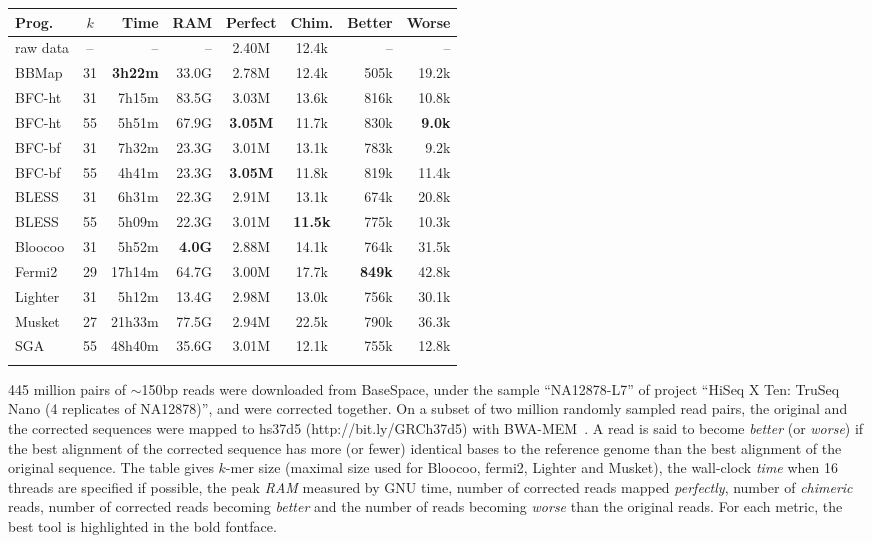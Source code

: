 \documentclass{bioinfo}
\begin{document}
\begin{table}[t]
{\footnotesize
\begin{tabular}{lcrrccrr}
\toprule
Prog.     & $k$ & Time  & RAM   & Perfect&Chim.& Better & Worse \\
\midrule
raw data  & --  & --    & --    & 2.40M  & 12.4k  & --     & -- \\
BBMap     & 31  &{\bf 3h22m}&33.0G& 2.78M& 12.4k  & 505k   & 19.2k \\
BFC-ht    & 31  & 7h15m & 83.5G & 3.03M  &13.6k   & 816k   & 10.8k \\
BFC-ht    & 55  & 5h51m & 67.9G &{\bf 3.05M}&11.7k& 830k   &{\bf 9.0k}\\
BFC-bf    & 31  & 7h32m & 23.3G & 3.01M  & 13.1k  & 783k   & 9.2k \\
BFC-bf    & 55  & 4h41m & 23.3G &{\bf 3.05M}&11.8k& 819k   & 11.4k \\
BLESS     & 31  & 6h31m & 22.3G & 2.91M  & 13.1k  & 674k   & 20.8k \\
BLESS     & 55  & 5h09m & 22.3G & 3.01M  &{\bf 11.5k}& 775k& 10.3k \\
Bloocoo   & 31  & 5h52m &{\bf 4.0G}&2.88M& 14.1k  & 764k   & 31.5k  \\
Fermi2    & 29  &17h14m & 64.7G & 3.00M  & 17.7k  &{\bf 849k}&42.8k \\
Lighter   & 31  & 5h12m & 13.4G & 2.98M  & 13.0k  & 756k   & 30.1k  \\
Musket    & 27  &21h33m & 77.5G & 2.94M  & 22.5k  & 790k   & 36.3k  \\
SGA       & 55  &48h40m & 35.6G & 3.01M  & 12.1k  & 755k   & 12.8k  \\
\botrule
\end{tabular}}{445 million pairs of $\sim$150bp reads were downloaded from
BaseSpace, under the sample ``NA12878-L7'' of project ``HiSeq X Ten: TruSeq
Nano (4 replicates of NA12878)'', and were corrected together. On a subset of
two million randomly sampled read pairs, the original and the corrected
sequences were mapped to hs37d5 (http://bit.ly/GRCh37d5) with
BWA-MEM~\citep{Li:2013aa}.  A read is said to become \emph{better} (or
\emph{worse}) if the best alignment of the corrected sequence has more (or
fewer) identical bases to the reference genome than the best alignment of the
original sequence. The table gives $k$-mer size (maximal size used for Bloocoo,
fermi2, Lighter and Musket), the wall-clock \emph{time} when 16 threads are
specified if possible, the peak \emph{RAM} measured by GNU time, number of
corrected reads mapped \emph{perfectly}, number of \emph{chimeric} reads,
number of corrected reads becoming \emph{better} and the number of reads
becoming \emph{worse} than the original reads. For each metric, the best tool
is highlighted in the bold fontface.}
\end{table}
\end{document}
